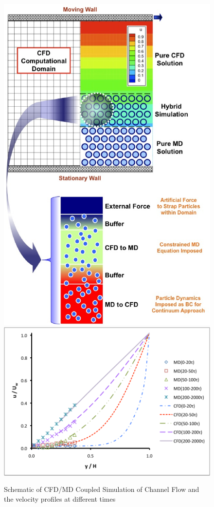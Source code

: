 \documentclass[conference,final]{IEEEtran}
\begin{document}
\begin{figure}
\centering
\includegraphics[scale=0.45]{fig1.eps}
\linebreak
\includegraphics[scale=0.50]{Vel_Profile.PDF}
\caption{\small Schematic of CFD/MD Coupled Simulation of Channel Flow and the velocity profiles at different times}
\label{Fig:Couette}
\end{figure}
\end{document}
